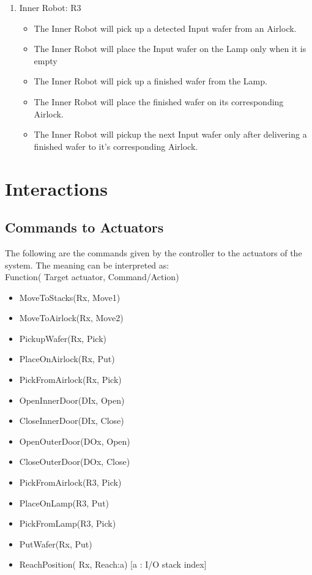 \documentclass[a4paper,12pt]{article}
\begin{document}
\begin{enumerate}
\item Inner Robot: R3
	\begin{itemize}
	\item The Inner Robot will pick up a detected Input wafer from an Airlock.
	\item The Inner Robot will place the Input wafer on the Lamp only when it is empty
	\item The Inner Robot will pick up a finished wafer from the Lamp.
	\item The Inner Robot will place the finished wafer on its corresponding Airlock.
	\item The Inner Robot will pickup the next Input wafer only after delivering a finished wafer to it's corresponding Airlock.
	\end{itemize}

\end{enumerate}


\section{Interactions} 
\subsection {Commands to Actuators}
The following are the commands given by the controller to the actuators of the system. The meaning can be interpreted as:\\
Function( Target actuator, Command/Action)
\begin{itemize}
\item MoveToStacks(Rx, Move1)
\item MoveToAirlock(Rx, Move2)
\item PickupWafer(Rx, Pick)
\item PlaceOnAirlock(Rx, Put)
\item PickFromAirlock(Rx, Pick)
\item OpenInnerDoor(DIx, Open)
\item CloseInnerDoor(DIx, Close)
\item OpenOuterDoor(DOx, Open)
\item CloseOuterDoor(DOx, Close)
\item PickFromAirlock(R3, Pick)
\item PlaceOnLamp(R3, Put)
\item PickFromLamp(R3, Pick)
\item PutWafer(Rx, Put)
\item ReachPosition( Rx, Reach:a)            [a : I/O stack index]
\end{itemize}
\end{document}
